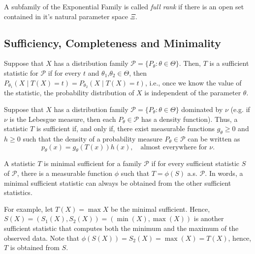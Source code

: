 \begin{definition}
	A subfamily of the Exponential Family is called \textit{full rank}
	if there is an open set contained in it's natural parameter space $\Xi$.
\end{definition}

\subsection{Sufficiency, Completeness and Minimality}

\begin{definition}
	Suppose that $X$ has a distribution family $\mathcal P = \{P_\theta : \theta \in \Theta\}$. Then,
	$T$ is a sufficient statistic for $\mathcal P$ if for every $t$ and $\theta_1$,$\theta_2 \in \Theta$,
	then $P_{\theta_1}(X \mid T(X) = t) = P_{\theta_2}(X \mid T(X) = t)$, i.e., once we know the value
	of the statistic, the probability distribution of $X$ is independent of the parameter $\theta$.
\end{definition}

\begin{definition}
	Suppose that $X$ has a distribution family $\mathcal P = \{P_\theta : \theta \in \Theta\}$ dominated
	by $\nu$ (e.g. if $\nu$ is the Lebesgue measure, then each $P_\theta \in \mathcal P$ has a density function).
	Thus, a statistic $T$ is sufficient if, and only if, there exist measurable functions $g_\theta \geq 0$ and
	$h\geq 0$ such that the density of a probability measure $P_\theta \in \mathcal P$ can be written as
	\begin{equation}
		p_\theta(x) = g_\theta(T(x)) h(x), \quad \text{almost everywhere for }\nu.
	\end{equation}
\end{definition}

\begin{definition}
	A statistic $T$ is minimal sufficient for a family $\mathcal P$
	if for every sufficient statistic $S$ of $\mathcal P$, there is
	a measurable function $\phi$ such that $T = \phi(S)$ a.s. $\mathcal P$. In words,
	a minimal sufficient statistic can always be obtained from the other sufficient statistics.
\end{definition}

For example, let $T(X)= \max{X}$ be the minimal sufficient. Hence, $S(X) = (S_1(X),S_2(X))=(\min(X),\max(X))$
is another sufficient statistic that computes both the minimum and the maximum of the observed data.
Note that $\phi(S(X)) = S_2(X) = \max(X) = T(X)$, hence, $T$ is obtained from $S$.

